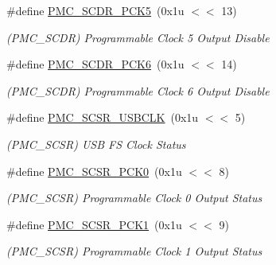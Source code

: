 \begin{DoxyCompactItemize}
\mbox{\label{group__SAMV71__PMC_ga1cdd79cbb68533f00c18036bf00ce4d8}} 
\#define \mbox{\hyperlink{group__SAMV71__PMC_ga1cdd79cbb68533f00c18036bf00ce4d8}{P\+M\+C\+\_\+\+S\+C\+D\+R\+\_\+\+P\+C\+K5}}~(0x1u $<$$<$ 13)
\begin{DoxyCompactList}\small\item\em (P\+M\+C\+\_\+\+S\+C\+DR) Programmable Clock 5 Output Disable \end{DoxyCompactList}\item 
\mbox{\label{group__SAMV71__PMC_gab2a6789dc5f4f2ad0e70ba03e4a1afea}} 
\#define \mbox{\hyperlink{group__SAMV71__PMC_gab2a6789dc5f4f2ad0e70ba03e4a1afea}{P\+M\+C\+\_\+\+S\+C\+D\+R\+\_\+\+P\+C\+K6}}~(0x1u $<$$<$ 14)
\begin{DoxyCompactList}\small\item\em (P\+M\+C\+\_\+\+S\+C\+DR) Programmable Clock 6 Output Disable \end{DoxyCompactList}\item 
\mbox{\label{group__SAMV71__PMC_gaae4649949446a4c6141a337bc45b1c30}} 
\#define \mbox{\hyperlink{group__SAMV71__PMC_gaae4649949446a4c6141a337bc45b1c30}{P\+M\+C\+\_\+\+S\+C\+S\+R\+\_\+\+U\+S\+B\+C\+LK}}~(0x1u $<$$<$ 5)
\begin{DoxyCompactList}\small\item\em (P\+M\+C\+\_\+\+S\+C\+SR) U\+SB FS Clock Status \end{DoxyCompactList}\item 
\mbox{\label{group__SAMV71__PMC_ga6eabb3e97d15e03c3d972905170d971c}} 
\#define \mbox{\hyperlink{group__SAMV71__PMC_ga6eabb3e97d15e03c3d972905170d971c}{P\+M\+C\+\_\+\+S\+C\+S\+R\+\_\+\+P\+C\+K0}}~(0x1u $<$$<$ 8)
\begin{DoxyCompactList}\small\item\em (P\+M\+C\+\_\+\+S\+C\+SR) Programmable Clock 0 Output Status \end{DoxyCompactList}\item 
\mbox{\label{group__SAMV71__PMC_gaeb9d3d3ebc60d5e7c5770b2ff71c6279}} 
\#define \mbox{\hyperlink{group__SAMV71__PMC_gaeb9d3d3ebc60d5e7c5770b2ff71c6279}{P\+M\+C\+\_\+\+S\+C\+S\+R\+\_\+\+P\+C\+K1}}~(0x1u $<$$<$ 9)
\begin{DoxyCompactList}\small\item\em (P\+M\+C\+\_\+\+S\+C\+SR) Programmable Clock 1 Output Status \end{DoxyCompactList}\item 
$$
\end{DoxyCompactItemize}
